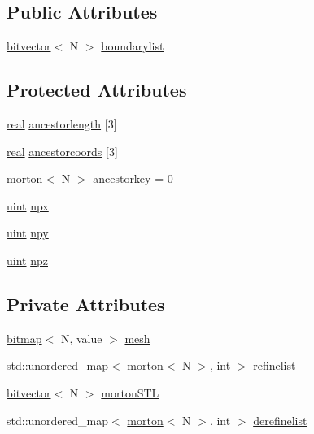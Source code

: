 \subsection*{Public Attributes}
\begin{DoxyCompactItemize}
\item 
\mbox{\hyperlink{definitions_8h_a55821d7929f3f16aaf1466129c209492}{bitvector}}$<$ N $>$ \mbox{\hyperlink{classTree_aa9c837fabf42230cfd53775130886cc6}{boundarylist}}
\end{DoxyCompactItemize}
\subsection*{Protected Attributes}
\begin{DoxyCompactItemize}
\item 
\mbox{\hyperlink{definitions_8h_aedc0ad84d1e764530814f57ad931d02a}{real}} \mbox{\hyperlink{classTree_a6dd200497bd886db369d621cc05af09f}{ancestorlength}} \mbox{[}3\mbox{]}
\item 
\mbox{\hyperlink{definitions_8h_aedc0ad84d1e764530814f57ad931d02a}{real}} \mbox{\hyperlink{classTree_a2199b0f2221e9bac89bbf57ac1fef24e}{ancestorcoords}} \mbox{[}3\mbox{]}
\item 
\mbox{\hyperlink{definitions_8h_af8682350bd8bb38ee9023f7a0a310add}{morton}}$<$ N $>$ \mbox{\hyperlink{classTree_a8b6e0e406bcbfc2b8e1598cfc967e6c8}{ancestorkey}} = 0
\item 
\mbox{\hyperlink{definitions_8h_a69aa29b598b851b0640aa225a9e5d61d}{uint}} \mbox{\hyperlink{classTree_a18a47db1dd6763090994bfe28d89b8f6}{npx}}
\item 
\mbox{\hyperlink{definitions_8h_a69aa29b598b851b0640aa225a9e5d61d}{uint}} \mbox{\hyperlink{classTree_af436baa75e35a4786a377b6fe237c5e0}{npy}}
\item 
\mbox{\hyperlink{definitions_8h_a69aa29b598b851b0640aa225a9e5d61d}{uint}} \mbox{\hyperlink{classTree_a0b132f3e84c33e27e1f78f0542081e7b}{npz}}
\end{DoxyCompactItemize}
\subsection*{Private Attributes}
\begin{DoxyCompactItemize}
\item 
\mbox{\hyperlink{definitions_8h_acf2396ef4de9eb8a6324b9f1a624ea85}{bitmap}}$<$ N, value $>$ \mbox{\hyperlink{classTree_a2baee1e4878452eac675671775360145}{mesh}}
\item 
std\+::unordered\+\_\+map$<$ \mbox{\hyperlink{definitions_8h_af8682350bd8bb38ee9023f7a0a310add}{morton}}$<$ N $>$, int $>$ \mbox{\hyperlink{classTree_a2fbb2b9ed44f73aa10192eab2a9d126b}{refinelist}}
\item 
\mbox{\hyperlink{definitions_8h_a55821d7929f3f16aaf1466129c209492}{bitvector}}$<$ N $>$ \mbox{\hyperlink{classTree_ab97dba8fe7958a363ff7eac2f8199dba}{morton\+S\+TL}}
\item 
std\+::unordered\+\_\+map$<$ \mbox{\hyperlink{definitions_8h_af8682350bd8bb38ee9023f7a0a310add}{morton}}$<$ N $>$, int $>$ \mbox{\hyperlink{classTree_acfb17b257f964def045244fbd73f8c6c}{derefinelist}}
\end{DoxyCompactItemize}
